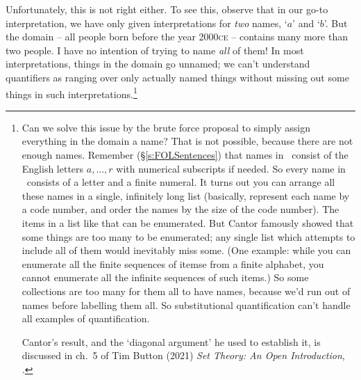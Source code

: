 Unfortunately, this is not right either. To see this, observe that in our go-to interpretation, we have only given interpretations for \emph{two} names, `$a$' and `$b$'. But the domain – all people born before the year 2000\textsc{ce} – contains many more than two people. I have no intention of trying to name \emph{all} of them!  In most interpretations, things in the domain go unnamed; we can't understand quantifiers as ranging over only actually named things without missing out some things in such interpretations.\footnote{Can we solve this issue by the brute force proposal to simply assign everything in the domain a name? That is not possible, because there are not enough names. Remember (§\ref{s:FOLSentences}) that names in \FOL\ consist of the English letters $a,…,r$ with numerical subscripts if needed. So every name in \FOL\ consists of a letter and a finite numeral. It turns out you can arrange all these names in a single, infinitely long list (basically, represent each name by a code number, and order the names by the size of the code number). The items in a list like that can be enumerated. But Cantor famously showed that some things are too many to be enumerated; any single list which attempts to include all of them would inevitably miss some. (One example: while you can enumerate all the finite sequences of itemse from a finite alphabet, you cannot enumerate all the infinite sequences of such items.) So some collections are too many for them all to have names, because we'd run out of names before labelling them all. So substitutional quantification can't handle all examples of quantification.

Cantor's result, and the `diagonal argument' he used to establish it, is discussed in ch.~5 of Tim Button (2021) \emph{Set Theory: An Open Introduction}, .}


